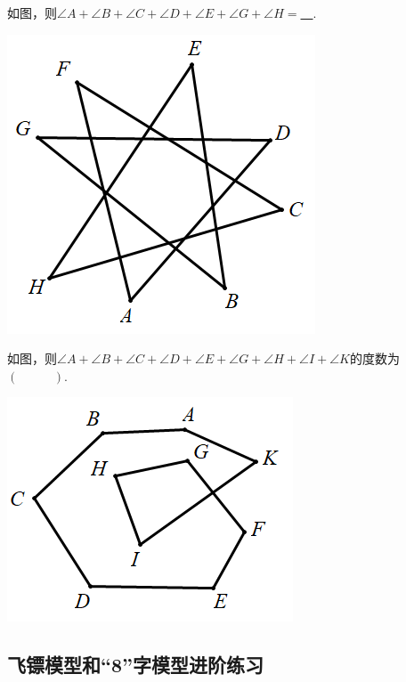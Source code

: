 \begin{shaded}
\begin{example}
如图，则$\angle A+\angle B+\angle C+\angle D+\angle E+\angle G+\angle H=$\underline{~\hspace{1cm}~}.
\end{example}
\end{shaded}
 \includegraphics[scale=0.5]{figure/bazhi07.PNG}
\begin{shaded}
\begin{example}
如图，则$\angle A+\angle B+\angle C+\angle D+\angle E+\angle G+\angle H+\angle I+\angle K$的度数为$(~\hspace{1cm}~)$.\\
\end{example}
\end{shaded}
 \includegraphics[scale=0.5]{figure/bazhi08.PNG}
\subsection{飞镖模型和“8”字模型进阶练习}

